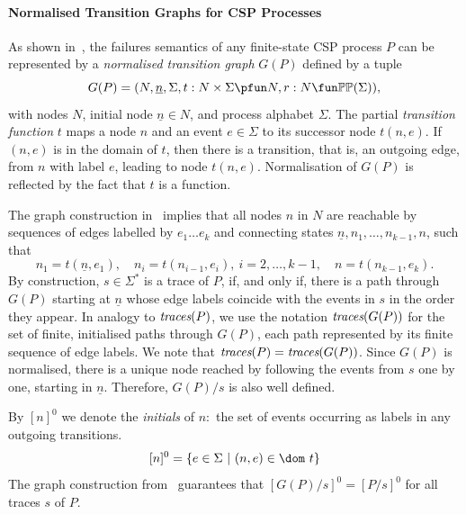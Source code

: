 \documentclass[3p,times]{elsarticle}
\newcommand{\trc}{\text{\it traces}}
\newcommand{\ii}[1]{\underline{#1}}
\begin{document}
\paragraph{Normalised Transition Graphs for CSP Processes} \label{sec:ntg}

As shown in~\cite{Roscoe:1994:chapter}, the failures semantics of any
finite-state CSP process $P$ can be represented by a \emph{normalised
transition graph} $G(P)$ defined by a tuple
$$
G(P) = ( N, \ii n, \Sigma, t : N\times\Sigma \pfun N, r : N \fun \mathbb{P}\mathbb{P}(\Sigma)),
$$
with nodes $N$, initial node $\ii n\in N$, and process alphabet $\Sigma$. The
partial \emph{transition function} $t$ maps a node $n$ and an event
$e\in\Sigma$ to its successor node $t(n,e)$. If $(n,e)$ is in the domain of
$t$, then there is a transition, that is, an outgoing edge, from $n$ with
label $e$, leading to node $t(n,e)$. Normalisation of $G(P)$ is reflected by
the fact that $t$ is a function.

The graph construction in~\cite{Roscoe:1994:chapter} implies that all nodes
$n$ in $N$ are reachable by sequences of edges labelled by $e_1\dots e_k$ and
connecting states $\ii n,n_1,\dots,n_{k-1},n$, such that
\[
n_1 = t(\ii n,e_1), \quad n_i = t(n_{i-1},e_i),\ i = 2,\dots,k-1,\quad
n= t(n_{k-1},e_k).
\]
%
By construction, $s\in\Sigma^*$ is a trace of $P$, if, and only if, there is
a path through $G(P)$ starting  at $\ii n$ whose edge labels coincide with
the events in $s$ in the order they appear. In analogy to $\trc(P)$, we use
the notation $\trc(G(P))$ for the set of finite, initialised paths through
$G(P)$, each path represented by its finite sequence of edge labels. We note
that $\trc(P) = \trc(G(P))$. Since $G(P)$ is normalised, there is a unique
node reached by following the events from $s$ one by one, starting in $\ii
n$. Therefore, $G(P)/s$  is also well defined.

By $[n]^0$ we denote the \emph{initials} of $n$:~the set of events occurring
as labels in any outgoing transitions.
$$
[n]^0 = \{ e\in\Sigma~|~(n,e)\in\dom~t \}
$$
The graph construction from~\cite{Roscoe:1994:chapter} guarantees that $[G(P)/s]^0 = [P/s]^0$ for all
traces $s$ of $P$.
\end{document}
